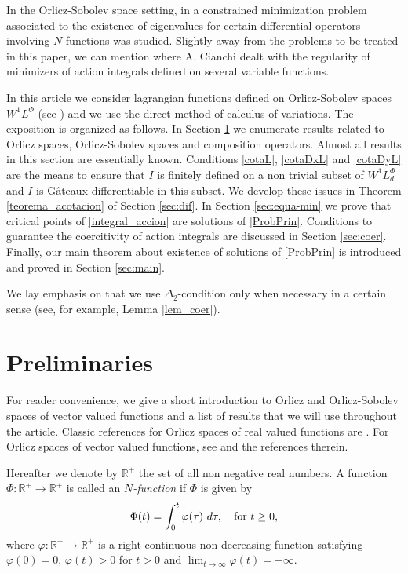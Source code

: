 \documentclass[twoside]{elsarticle}
\theoremstyle{remark}
\newcommand{\lphi}{L^{\Phi}}
\begin{document}
  In the Orlicz-Sobolev space setting, 
	in \cite{m-1999} a constrained minimization problem associated to the existence of eigenvalues for certain differential operators involving $N$-functions was studied.  
Slightly away from the problems to be treated in this paper, 
we can mention \cite{cianchi2000local, cianchi1999gradient} where A. Cianchi dealt with 
the regularity of minimizers of action integrals defined on several variable functions.

In this article  we consider lagrangian functions  defined on Orlicz-Sobolev spaces $W^{1}L^{\Phi}$    
(see \cite{adams_sobolev,KR, rao1991theory,2002applications}) 
and we use  the direct method of calculus of variations. 
The exposition is organized as follows. 
In Section \ref{preliminares} we enumerate results related to Orlicz spaces, Orlicz-Sobolev spaces and composition operators. 
Almost all results in this section  are essentially known. Conditions \eqref{cotaL}, \eqref{cotaDxL} and \eqref{cotaDyL} are the means to ensure that $I$ is finitely defined on 
a non trivial subset of $W^{1}\lphi_d$ and $I$ is G\^ateaux differentiable in this subset. We develop  these issues in Theorem \ref{teorema_acotacion}  of Section \ref{sec:dif}. In Section \ref{sec:equa-min} we prove that critical points of \eqref{integral_accion}
 are solutions of \eqref{ProbPrin}. Conditions to guarantee the coercitivity of action integrals are discussed in Section \ref{sec:coer}. Finally, our main theorem about existence of solutions of  \eqref{ProbPrin} is introduced and proved in Section \ref{sec:main}. 

We lay emphasis on that we use $\Delta_2$-condition only when 
necessary in a certain sense (see, for example, Lemma \ref{lem_coer}).
   




\section{Preliminaries}\label{preliminares}


For reader convenience, we give a short introduction to Orlicz and Orlicz-Sobolev spaces of vector valued functions and a  list  of results that we will use throughout the article. 
Classic references for Orlicz spaces of real valued functions are \cite{adams_sobolev,KR,rao1991theory}.
For  Orlicz spaces of vector valued functions, see \cite{Orliczvectorial2005} and the references therein.

Hereafter we denote  by $\mathbb{R}^+$  the set of all non negative real numbers. A function $\Phi:\mathbb{R}^+\to \mathbb{R}^+ $ is called an \emph{$N$-function} if $\Phi$ is given by 
\[
\Phi(t)=\int_{0}^t \varphi(\tau)\ d\tau,\quad\hbox{for } t\geq 0,
\]
where $\varphi:\mathbb{R}^+\rightarrow \mathbb{R}^+$ is a right continuous non decreasing function  satisfying   $\varphi(0)=0$, $\varphi(t)>0$ for $t>0$ and
$\lim_{t\rightarrow \infty}\varphi(t)=+\infty$.
\end{document}
